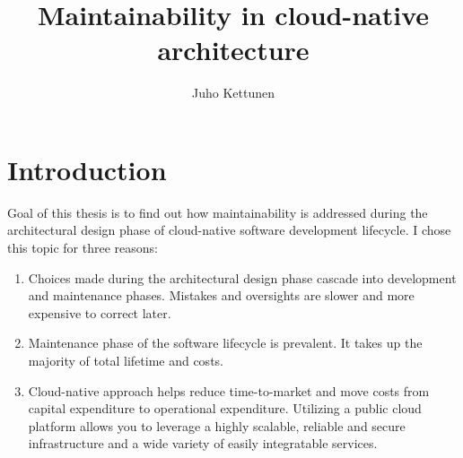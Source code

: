 \documentclass[utf8,english]{gradu3}
\begin{document}
\title{Maintainability in cloud-native architecture}

\author{Juho Kettunen}

\maketitle


\mainmatter

\chapter{Introduction}

Goal of this thesis is to find out how maintainability is addressed during the
architectural design phase of cloud-native software development lifecycle.
I chose this topic for three reasons:
\begin{enumerate}
  \item Choices made during the architectural design phase cascade into
        development and maintenance phases. Mistakes and oversights are
        slower and more expensive to correct later.
  \item Maintenance phase of the software lifecycle is prevalent.
        It takes up the majority of total lifetime and costs.
  \item Cloud-native approach helps reduce time-to-market and move costs from
        capital expenditure to operational expenditure. Utilizing a public cloud
        platform allows you to leverage a highly scalable, reliable and secure
        infrastructure and a wide variety of easily integratable services.
\end{enumerate}
\end{document}
